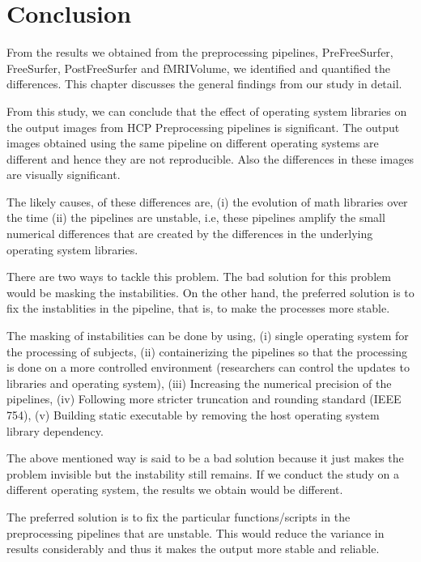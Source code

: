 \chapter{Conclusion}
From the results we obtained from the preprocessing pipelines, PreFreeSurfer, FreeSurfer, PostFreeSurfer and fMRIVolume, we identified and quantified the differences. This chapter discusses the general findings from our study in detail.

From this study, we can conclude that the effect of operating system libraries on the output images from HCP Preprocessing pipelines is significant. The output images obtained using the same pipeline on different operating systems are different and hence they are not reproducible. Also the differences in these images are visually significant.

The likely causes, of these differences are, (i) the evolution of math libraries over the time (ii) the pipelines are unstable, i.e, these pipelines amplify the small numerical differences that are created by the differences in the underlying operating system libraries.

There are two ways to tackle this problem. The bad solution for this problem would be masking the instabilities. On the other hand, the preferred solution is to fix the instablities in the pipeline, that is, to make the processes more stable.

The masking of instabilities can be done by using, (i) single operating system for the processing of subjects, (ii) containerizing the pipelines so that the processing is done on a more controlled environment (researchers can control the updates to libraries and operating system), (iii) Increasing the numerical precision of the pipelines, (iv) Following more stricter truncation and rounding standard (IEEE 754), (v) Building static executable by removing the host operating system library dependency.

The above mentioned way is said to be a bad solution because it just makes the problem invisible but the instability still remains. If we conduct the study on a different operating system, the results we obtain would be different.

The preferred solution is to fix the particular functions/scripts in the preprocessing pipelines that are unstable. This would reduce the variance in results considerably and thus it makes the output more stable and reliable.



